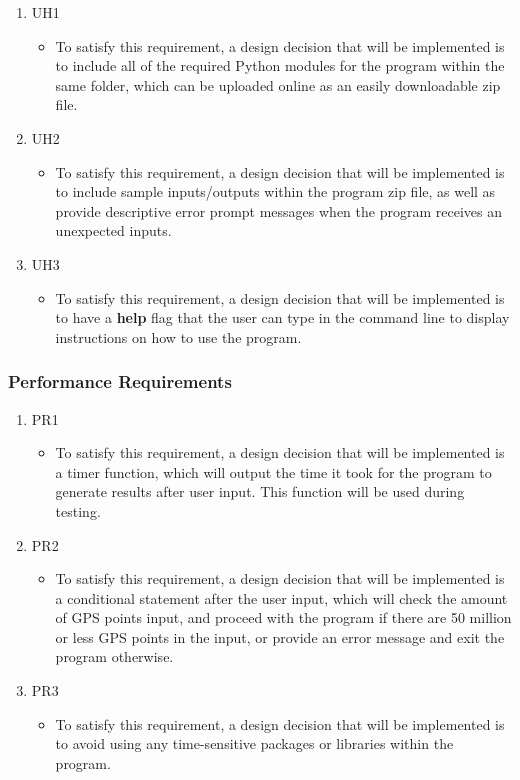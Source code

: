\documentclass[12pt, titlepage]{article}
\begin{document}
\begin{enumerate}
    \item UH1
    \begin{itemize}
        \item To satisfy this requirement, a design decision that will be implemented 
        is to include all of the required Python modules for the program within the same folder, which can be uploaded online as an easily downloadable zip file.
    \end{itemize}
    \item UH2
    \begin{itemize}
        \item To satisfy this requirement, a design decision that will be implemented is to include sample inputs/outputs within the program zip file, as well as provide descriptive error prompt messages when the program receives an unexpected inputs.
    \end{itemize}
    \item UH3
    \begin{itemize}
        \item To satisfy this requirement, a design decision that will be implemented is to have a \textbf{help} flag that the user can type in the command line to display instructions on how to use the program.
    \end{itemize}
\end{enumerate}

\subsubsection{Performance Requirements}

\begin{enumerate}
    \item PR1
    \begin{itemize}
        \item To satisfy this requirement, a design decision that will be implemented is a timer function, which will output the time it took for the program to generate results after user input. This function will be used during testing.
    \end{itemize}
    \item PR2
    \begin{itemize}
        \item To satisfy this requirement, a design decision that will be implemented is a conditional statement after the user input, which will check the amount of GPS points input, and proceed with the program if there are 50 million or less GPS points in the input, or provide an error message and exit the program otherwise.
    \end{itemize}
    \item PR3
    \begin{itemize}
        \item To satisfy this requirement, a design decision that will be implemented is to avoid using any time-sensitive packages or libraries within the program.
    \end{itemize}
\end{enumerate}
\end{document}
